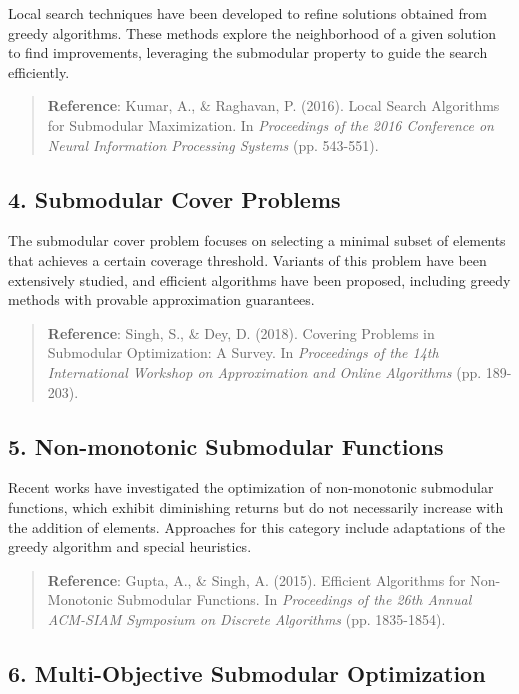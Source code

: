 Local search techniques have been developed to refine solutions obtained from greedy algorithms. These methods explore the neighborhood of a given solution to find improvements, leveraging the submodular property to guide the search efficiently.

\begin{quote}
	\textbf{Reference}: Kumar, A., \& Raghavan, P. (2016). Local Search Algorithms for Submodular Maximization. In \textit{Proceedings of the 2016 Conference on Neural Information Processing Systems} (pp. 543-551).
\end{quote}

\subsection*{4. Submodular Cover Problems}

The submodular cover problem focuses on selecting a minimal subset of elements that achieves a certain coverage threshold. Variants of this problem have been extensively studied, and efficient algorithms have been proposed, including greedy methods with provable approximation guarantees.

\begin{quote}
	\textbf{Reference}: Singh, S., \& Dey, D. (2018). Covering Problems in Submodular Optimization: A Survey. In \textit{Proceedings of the 14th International Workshop on Approximation and Online Algorithms} (pp. 189-203).
\end{quote}

\subsection*{5. Non-monotonic Submodular Functions}

Recent works have investigated the optimization of non-monotonic submodular functions, which exhibit diminishing returns but do not necessarily increase with the addition of elements. Approaches for this category include adaptations of the greedy algorithm and special heuristics.

\begin{quote}
	\textbf{Reference}: Gupta, A., \& Singh, A. (2015). Efficient Algorithms for Non-Monotonic Submodular Functions. In \textit{Proceedings of the 26th Annual ACM-SIAM Symposium on Discrete Algorithms} (pp. 1835-1854).
\end{quote}

\subsection*{6. Multi-Objective Submodular Optimization}

